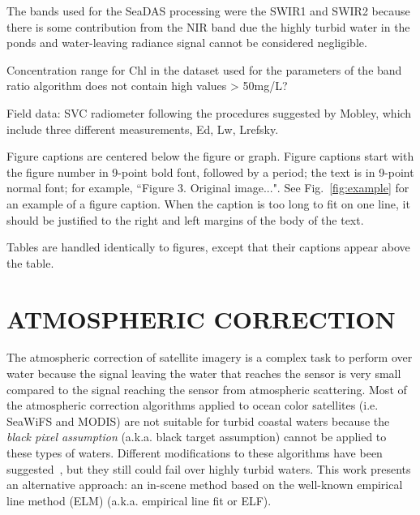 \documentclass[]{spie}  %
\begin{document}
The bands used for the SeaDAS processing were the SWIR1 and SWIR2 because there is some contribution from the NIR band due the highly turbid water in the ponds and water-leaving radiance signal cannot be considered negligible.

Concentration range for Chl in the dataset used for the parameters of the band ratio algorithm does not contain high values > 50mg/L?

Field data: SVC radiometer following the procedures suggested by Mobley, which include three different measurements, Ed, Lw, Lrefsky.


Figure captions are centered below the figure or graph.  Figure captions start with the figure number in 9-point bold font, followed by a period; the text is in 9-point normal font; for example, ``{\footnotesize{Figure 3.}  Original image...}".  See Fig.~\ref{fig:example} for an example of a figure caption.  When the caption is too long to fit on one line, it should be justified to the right and left margins of the body of the text.  

Tables are handled identically to figures, except that their captions appear above the table. 
\section{ATMOSPHERIC CORRECTION}
The atmospheric correction of satellite imagery is a complex task to perform over water because the signal leaving the water that reaches the sensor is very small compared to the signal reaching the sensor from atmospheric scattering. Most of the atmospheric correction algorithms applied to ocean color satellites (i.e. SeaWiFS and MODIS) are not suitable for turbid coastal waters because the {\it black pixel assumption} (a.k.a. black target assumption) cannot be applied to these types of waters. Different modifications to these algorithms have been suggested~\cite{Mobley:1999}, but they still could fail over highly turbid waters. This work presents an alternative approach: an in-scene method based on the well-known empirical line method (ELM) (a.k.a. empirical line fit or ELF).
\label{sec:atmcorr}  %
\end{document}
